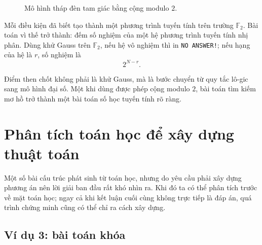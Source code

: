 \documentclass[11pt]{article}
\begin{document}
\begin{figure}[ht]
\centering
{}
\caption{Mô hình tháp đèn tam giác bằng cộng modulo \(2\).}
\end{figure}

Mỗi điều kiện đã biết tạo thành một phương trình tuyến tính trên trường
\(\mathbb F_2\). Bài toán vì thế trở thành: đếm số nghiệm của một hệ phương
trình tuyến tính nhị phân. Dùng khử Gauss trên \(\mathbb F_2\), nếu hệ vô
nghiệm thì in \texttt{NO ANSWER!}; nếu hạng của hệ là \(r\), số nghiệm là
\[
  2^{N-r}.
\]

Điểm then chốt không phải là khử Gauss, mà là bước chuyển từ quy tắc lô-gic
sang mô hình đại số. Một khi dùng được phép cộng modulo \(2\), bài toán tìm
kiếm mơ hồ trở thành một bài toán số học tuyến tính rõ ràng.

\section{Phân tích toán học để xây dựng thuật toán}

Một số bài cấu trúc phát sinh từ toán học, nhưng do yêu cầu phải xây dựng
phương án nên lời giải ban đầu rất khó nhìn ra. Khi đó ta có thể phân tích
trước về mặt toán học; ngay cả khi kết luận cuối cùng không trực tiếp là đáp
án, quá trình chứng minh cũng có thể chỉ ra cách xây dựng.

\subsection{Ví dụ 3: bài toán khóa}
\end{document}
